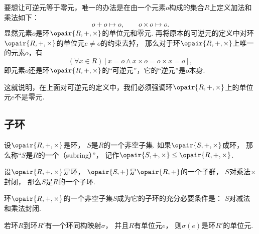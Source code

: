 \begin{example}
要想让可逆元等于零元，唯一的办法是在由一个元素\(o\)构成的集合\(R\)上定义加法和乘法如下：\begin{equation*}
	o + o \mapsto o,
	\qquad
	o \times o \mapsto o.
\end{equation*}
显然元素\(o\)是环\(\opair{R,+,\times}\)的单位元和零元.
再将原本的可逆元的定义中对环\(\opair{R,+,\times}\)的单位元\(e \neq o\)的约束去掉，
那么对于环\(\opair{R,+,\times}\)上唯一的元素\(o\)，有\begin{equation*}
	(\forall x \in R)[x = o \land x \times o = o \times x = o],
\end{equation*}
即元素\(o\)还是环\(\opair{R,+,\times}\)的“可逆元”，它的“逆元”是\(o\)本身.

这就说明，在上面对可逆元的定义中，我们必须强调环\(\opair{R,+,\times}\)上的单位元\(e\)不是零元.
\end{example}

\subsection{子环}
\begin{definition}
设\(\opair{R,+,\times}\)是环，
\(S\)是\(R\)的一个非空子集.
如果\(\opair{S,+,\times}\)成环，
那么称“\(S\)是\(R\)的一个（subring）”，
记作\(\opair{S,+,\times}\AlgebraSubstructure\opair{R,+,\times}\).
\end{definition}

\begin{proposition}
设\(\opair{R,+,\times}\)是环，
\(\opair{S,+}\)是\(\opair{R,+}\)的一个子群，
\(S\)对乘法\(\times\)封闭，
那么\(S\)是\(R\)的一个子环.
\end{proposition}

\begin{proposition}
环\(\opair{R,+,\times}\)的一个非空子集\(S\)成为它的子环的充分必要条件是：
\(S\)对减法和乘法封闭.
\end{proposition}

\begin{proposition}
若环\(R\)到环\(R'\)有一个环同构映射\(\sigma\)，
并且\(R\)有单位元\(e\)，
则\(\sigma(e)\)是环\(R'\)的单位元.
\end{proposition}
